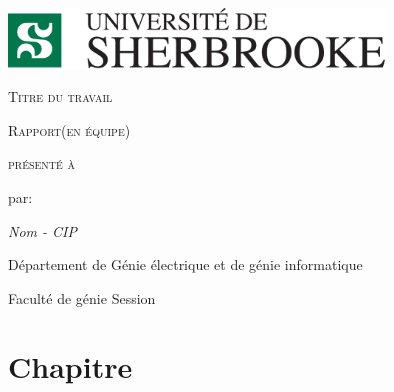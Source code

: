 \documentclass[letter,11pt]{report}
\begin{document}
\begin{titlepage}
	\setlength{\parskip}{0em}
	\centering \includegraphics[width=0.75\textwidth]{UdeS-logo.png}\par\vspace{1cm}
	\vspace{0.5cm}
	
	\vspace{2cm}
	{\scshape\LARGE\centering Titre du travail \par}
	{\scshape\large\centering Rapport(en équipe) \par}
	\vspace{2cm}
	{\centering\scshape présenté à \par}
	\vspace{2cm}
	{\centering par: \par}
	{\itshape\centering Nom - CIP \par}	
	\vspace{3cm}
	{\centering Département de Génie électrique et de génie informatique\par}
    {\centering Faculté de génie}
	\vfill
	{\centering Session}

\end{titlepage}

\tableofcontents
\setlength{\parskip}{1em}

\chapter{Chapitre}



\end{document}
